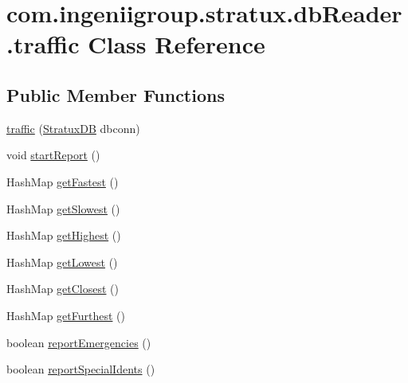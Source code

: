 \hypertarget{classcom_1_1ingeniigroup_1_1stratux_1_1db_reader_1_1traffic}{}\section{com.\+ingeniigroup.\+stratux.\+db\+Reader.\+traffic Class Reference}
\label{classcom_1_1ingeniigroup_1_1stratux_1_1db_reader_1_1traffic}
\subsection*{Public Member Functions}
\begin{DoxyCompactItemize}
\item 
\hyperlink{classcom_1_1ingeniigroup_1_1stratux_1_1db_reader_1_1traffic_aa4c163ca10b3c2aff7230ff2ba7c21ce}{traffic} (\hyperlink{classcom_1_1ingeniigroup_1_1stratux_1_1db_connect_1_1_stratux_d_b}{Stratux\+DB} dbconn)
\item 
void \hyperlink{classcom_1_1ingeniigroup_1_1stratux_1_1db_reader_1_1traffic_a0f3716cdec2ed740193c1eb6a9b27c7f}{start\+Report} ()
\item 
Hash\+Map \hyperlink{classcom_1_1ingeniigroup_1_1stratux_1_1db_reader_1_1traffic_a37aeda815f87a0372de47287bbca7da2}{get\+Fastest} ()
\item 
Hash\+Map \hyperlink{classcom_1_1ingeniigroup_1_1stratux_1_1db_reader_1_1traffic_aa6e868fb542d86d449f3095278573083}{get\+Slowest} ()
\item 
Hash\+Map \hyperlink{classcom_1_1ingeniigroup_1_1stratux_1_1db_reader_1_1traffic_a07b8e7ee8d7947a97c0000fff25d72bc}{get\+Highest} ()
\item 
Hash\+Map \hyperlink{classcom_1_1ingeniigroup_1_1stratux_1_1db_reader_1_1traffic_a230429a0b0684b49607537723a282b0f}{get\+Lowest} ()
\item 
Hash\+Map \hyperlink{classcom_1_1ingeniigroup_1_1stratux_1_1db_reader_1_1traffic_a4b20d5d540543bfbfe05541b7ccdfe53}{get\+Closest} ()
\item 
Hash\+Map \hyperlink{classcom_1_1ingeniigroup_1_1stratux_1_1db_reader_1_1traffic_ac5c07f120883de09096e633d3894adef}{get\+Furthest} ()
\item 
boolean \hyperlink{classcom_1_1ingeniigroup_1_1stratux_1_1db_reader_1_1traffic_addd30d342a8fb1f30bb2bffa18318a6d}{report\+Emergencies} ()
\item 
boolean \hyperlink{classcom_1_1ingeniigroup_1_1stratux_1_1db_reader_1_1traffic_a6603e1971f8d06595c1183b5fde80e70}{report\+Special\+Idents} ()
\end{DoxyCompactItemize}
